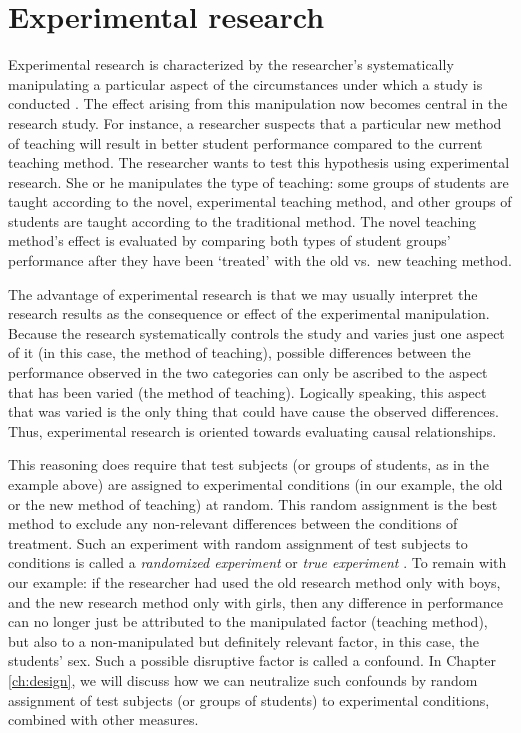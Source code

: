 \documentclass[
]{book}
\begin{document}
\hypertarget{sec:experimental-research}{%
\section{Experimental research}\label{sec:experimental-research}}

Experimental research is characterized by the researcher's systematically manipulating a particular aspect of the circumstances under which a study is conducted \citep{SCC02}. The effect arising from this manipulation now becomes central in the research study. For instance, a researcher suspects that a particular new method of teaching will result in better student performance compared to the current teaching method. The researcher wants to test this hypothesis using experimental research. She or he manipulates the type of teaching: some groups of students are taught according to the novel, experimental teaching method, and other groups of students are taught according to the traditional method. The novel teaching method's effect is evaluated by comparing both types of student groups' performance after they have been `treated' with the old vs.~new teaching method.

The advantage of experimental research is that we may usually interpret the research results as the consequence or effect of the experimental manipulation. Because the research systematically controls the study and varies just one aspect of it (in this case, the method of teaching), possible differences between the performance observed in the two categories can only be ascribed to the aspect that has been varied (the method of teaching). Logically speaking, this aspect that was varied is the only thing that could have cause the observed differences. Thus, experimental research is oriented towards evaluating causal relationships.

This reasoning does require that test subjects (or groups of students, as in the example above) are assigned to experimental conditions (in our example, the old or the new method of teaching) at random. This random assignment is the best method to exclude any non-relevant differences between the conditions of treatment. Such an experiment with random assignment of test subjects to conditions is called a \emph{randomized experiment} or \emph{true experiment} \citep{SCC02}. To remain with our example: if the researcher had used the old research method only with boys, and the new research method only with girls, then any difference in performance can no longer just be attributed to the manipulated factor (teaching method), but also to a non-manipulated but definitely relevant factor, in this case, the students' sex. Such a possible disruptive factor is called a confound. In Chapter \ref{ch:design}, we will discuss how we can neutralize such confounds by random assignment of test subjects (or groups of students) to experimental conditions, combined with other measures.
\end{document}
